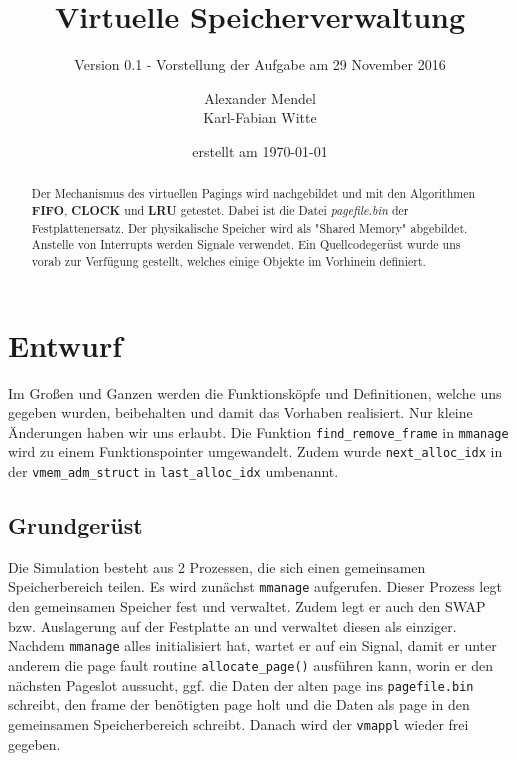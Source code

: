 \documentclass[
   draft=false
  ,paper=a4
  ,twoside=false
  ,fontsize=11pt
  ,headsepline
  ,BCOR10mm
  ,DIV11
  ,parskip=full+
]{scrartcl} %
\begin{document}
\titlehead{Betriebssysteme WS 2016 Praktikum 03}%
\subject{BS Praktikumsaufgabe 03}
\title{Virtuelle Speicherverwaltung}
\subtitle{Version 0.1 - Vorstellung der Aufgabe am 29 November 2016}
\author{Alexander Mendel \\ Karl-Fabian Witte}
\date{erstellt am \today}%
\maketitle%
\begin{abstract}
    Der Mechanismus des virtuellen Pagings wird nachgebildet und
    mit den Algorithmen \textbf{FIFO}, \textbf{CLOCK} und \textbf{LRU} 
    getestet. Dabei ist die Datei 
    \emph{pagefile.bin} der Festplattenersatz. Der physikalische Speicher 
    wird als
    "{}Shared Memory"{} abgebildet. Anstelle von Interrupts werden
    Signale verwendet. Ein Quellcodegerüst wurde uns vorab zur 
    Verfügung gestellt, welches einige Objekte im Vorhinein definiert. 
    \end{abstract}
\tableofcontents
\flushleft
\section{Entwurf}
Im Großen und Ganzen werden die Funktionsköpfe und Definitionen, welche 
uns gegeben wurden, beibehalten und damit das Vorhaben realisiert. Nur kleine
Änderungen haben wir uns erlaubt. Die Funktion \texttt{find\_remove\_frame} 
in \texttt{mmanage} wird zu einem Funktionspointer umgewandelt. Zudem wurde
\texttt{next\_alloc\_idx} in der \texttt{vmem\_adm\_struct} in 
\texttt{last\_alloc\_idx} umbenannt.
    \subsection{Grundgerüst}
        Die Simulation besteht aus 2 Prozessen, die sich einen gemeinsamen 
        Speicherbereich teilen. Es wird zunächst \texttt{mmanage} aufgerufen. 
        Dieser Prozess legt den gemeinsamen Speicher fest und verwaltet. Zudem 
        legt er auch den SWAP bzw. Auslagerung auf der Festplatte an und 
        verwaltet diesen als einziger. Nachdem \texttt{mmanage} alles 
        initialisiert hat, wartet er auf ein Signal, damit er unter anderem 
        die page fault routine \texttt{allocate\_page()} ausführen kann, worin 
        er den nächsten Pageslot aussucht, ggf. die Daten der alten page ins 
        \texttt{pagefile.bin} schreibt, den frame der benötigten page holt 
        und die Daten als page in den gemeinsamen Speicherbereich schreibt. Danach
        wird der \texttt{vmappl} wieder frei gegeben.
        
\end{document}
